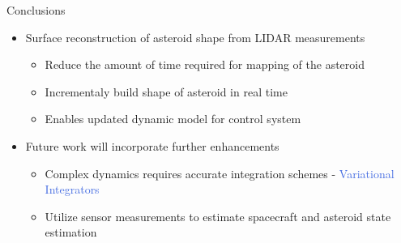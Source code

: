 \documentclass[final, usenames, dvipsnames]{beamer}
\newlength{\onecolwidth}
\def\Emph{\textcolor{RoyalBlue}}
\begin{document}
\begin{frame}[t]
\begin{columns}[T,onlytextwidth]
\begin{column}{\onecolwidth}
\begin{block}{Conclusions} %
    \begin{itemize}
        \item Surface reconstruction of asteroid shape from LIDAR measurements
            \begin{itemize}
                \item Reduce the amount of time required for mapping of the asteroid
                \item Incrementaly build shape of asteroid in real time
                \item Enables updated dynamic model for control system
            \end{itemize}
        \item Future work will incorporate further enhancements
            \begin{itemize}
                \item Complex dynamics requires accurate integration schemes - \Emph{Variational Integrators}
                \item Utilize sensor measurements to estimate spacecraft and asteroid state estimation
            \end{itemize}
    \end{itemize}
    \vspace*{1.6cm}
\end{block} %
\end{column}  %

\end{columns} %
\end{frame} %
\end{document}
